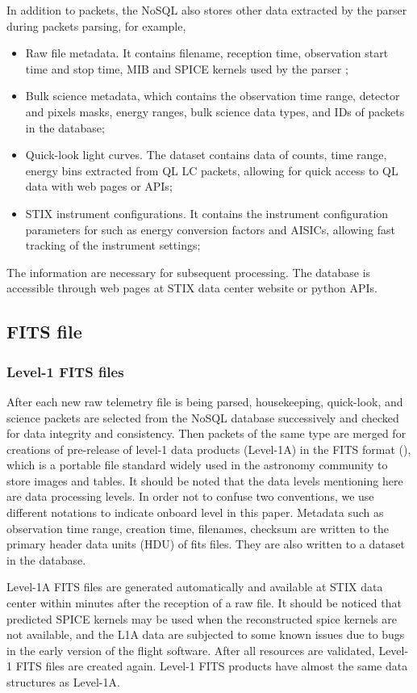 \documentclass{aa}
\begin{document}
In addition to packets, the NoSQL also stores other data extracted by the parser during packets parsing, 
for example, 
\begin{itemize}
  \item Raw file metadata. It contains filename, reception time, observation start time and stop time, MIB and SPICE kernels used by the parser ; 
  \item Bulk science metadata, which contains the observation time range, detector and pixels masks, energy ranges, 
   bulk science data types, and IDs of packets in the database; 
  \item Quick-look light curves.  The dataset contains data of counts, time range, energy bins extracted from QL LC packets, 
     allowing for  quick access to QL data with web pages or APIs;
  \item STIX instrument configurations. 
  It contains the instrument configuration parameters for such as  energy conversion factors and AISICs, 
  allowing fast tracking of the instrument settings;
\end{itemize}
The information are necessary for subsequent processing. The
database is  accessible through web pages at STIX data center website or python APIs. 
\subsection{FITS file}
\subsubsection{Level-1 FITS files}
After each new raw telemetry file is being parsed, 
housekeeping, quick-look, and science packets  
are selected from the NoSQL database successively 
and checked for data integrity and consistency. 
Then packets of the same type are merged for creations of pre-release of 
level-1 data products (Level-1A)
 in the FITS format (\cite{fits}), 
which is a portable file standard widely used in the astronomy 
community to store images and tables.
It should be noted that the data levels mentioning here are data processing levels. 
In order not to confuse two conventions, we use different notations to indicate onboard level in this paper. 
Metadata such as observation time range, creation time, filenames,  checksum are written to 
the primary header data units (HDU) of fits files. 
They are also written to a dataset in the database.

Level-1A FITS files are generated automatically and available at STIX data center within minutes 
after the reception of a raw file.
It should be noticed that predicted SPICE kernels may be used when the reconstructed spice kernels  
are not available, and the L1A data are subjected to some known issues 
due to bugs in the early version of the flight software.
After all resources are validated,  Level-1  FITS files are created again. 
Level-1  FITS products have almost the same data structures as Level-1A.
\end{document}
